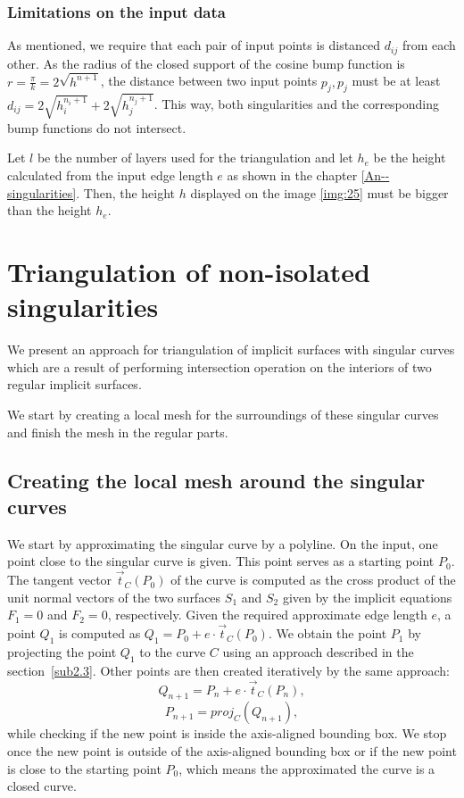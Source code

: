 \subsubsection*{Limitations on the input data}
\label{limitations}
As mentioned, we require that each pair of input points is
distanced $d_{ij}$ from each other. As the radius of the closed support
of the cosine bump function is $r=\frac{\pi}{k}=2\sqrt{h^{n+1}}$, the 
distance between two input points $p_j, p_j$ must be at least
$d_{ij} = 2\sqrt{h_i^{n_i+1}}+2\sqrt{h_j^{n_j+1}}$. This way, both singularities
and the corresponding bump functions do not intersect. 

Let $l$ be the number of layers used for the triangulation and let $h_e$ be the height
calculated from the input edge length $e$ as shown in the chapter \ref{An--singularities}.
Then, the height $h$ displayed on the image \ref{img:25} must be bigger than the
height $h_e$.

\section{Triangulation of non-isolated singularities}
\label{sub3.3} 

We present an approach for triangulation of implicit surfaces with singular
curves which are
a result of performing intersection operation on the interiors of two
regular implicit surfaces.

We start by creating a local mesh for the surroundings of these singular
curves and finish the mesh in the regular parts.

\subsection{Creating the local mesh around the singular curves}

We start by approximating the singular curve by a polyline.
On the input, one point close to the singular curve is given. This point serves as
a starting point $P_0$. The tangent vector $\vec{t}_C(P_0)$ of the curve is computed as
the cross product of the unit normal vectors of the two surfaces $S_1$ and $S_2$ given
by the implicit equations $F_1=0$ and $F_2=0$, respectively.
Given the required approximate edge length $e$, a point $Q_1$ is computed as
$Q_1 = P_0 + e \cdot \vec{t}_C(P_0)$. We obtain the point $P_1$ by projecting the point 
$Q_1$ to the curve $C$ using an approach described in the section~\ref{sub2.3}.
Other points are then created iteratively by the same approach:
$$Q_{n+1} = P_n + e \cdot \vec{t}_C(P_n),$$
$$P_{n+1} = proj_C(Q_{n+1}),$$
while checking if the new point is inside the axis-aligned bounding box.
We stop once the new point is outside of the axis-aligned bounding box or
if the new point is close to the starting point $P_0$, which means the approximated
the curve is a closed curve.

